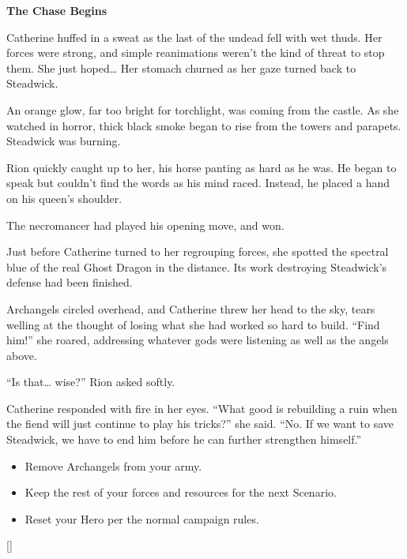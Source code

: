 \begin{multicols*}{2}
\textbf{The Chase Begins}

Catherine huffed in a sweat as the last of the undead fell with wet thuds. Her forces were strong, and simple reanimations weren't the kind of threat to stop them. She just hoped… Her stomach churned as her gaze turned back to Steadwick.

An orange glow, far too bright for torchlight, was coming from the castle. As she watched in horror, thick black smoke began to rise from the towers and parapets. Steadwick was burning.

Rion quickly caught up to her, his horse panting as hard as he was. He began to speak but couldn't find the words as his mind raced. Instead, he placed a hand on his queen's shoulder. 

The necromancer had played his opening move, and won.

Just before Catherine turned to her regrouping forces, she spotted the spectral blue of the real Ghost Dragon in the distance. Its work destroying Steadwick's defense had been finished.

Archangels circled overhead, and Catherine threw her head to the sky, tears welling at the thought of losing what she had worked so hard to build. ``Find him!'' she roared, addressing whatever gods were listening as well as the angels above.

``Is that… wise?'' Rion asked softly.

Catherine responded with fire in her eyes. ``What good is rebuilding a ruin when the fiend will just continue to play his tricks?'' she said. ``No. If we want to save Steadwick, we have to end him before he can further strengthen himself.''

\begin{itemize}
  \item \textcolor{darkcandyapplered}{Remove Archangels from your army.}
  \item \textcolor{darkcandyapplered}{Keep the rest of your forces and resources for the next Scenario.}
  \item \textcolor{darkcandyapplered}{Reset your Hero per the normal campaign rules.}
\end{itemize}

\columnbreak

\begin{center}
\raisebox{0pt}[\dimexpr{}\baselineskip\relax]{}
\end{center}

\end{multicols*}
